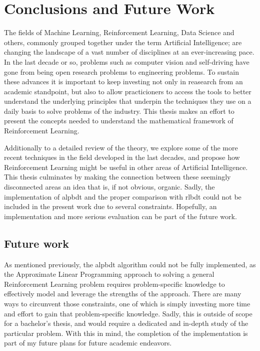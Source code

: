 \chapter{Conclusions and Future Work}
\label{chapter:Conclusions}

The fields of Machine Learning, Reinforcement Learning, Data Science and others,
commonly grouped together under the term Artificial Intelligence; are changing
the landscape of a vast number of disciplines at an ever-increasing pace. In the
last decade or so, problems such as computer vision and self-driving have gone
from being open research problems to engineering problems. To sustain these
advances it is important to keep investing not only in reasearch from an
academic standpoint, but also to allow practicioners to access the tools to
better understand the underlying principles that underpin the techniques they
use on a daily basis to solve problems of the industry. This thesis makes an
effort to present the concepts needed to understand the mathematical framework
of Reinforcement Learning.

Additionally to a detailed review of the theory, we explore some of the more
recent techniques in the field developed in the last decades, and propose how
Reinforcement Learning might be useful in other areas of Artificial
Intelligence. This thesis culminates by making the connection between these
seemingly disconnected areas an idea that is, if not obvious, organic. Sadly,
the implementation of \acf{alpbdt} and the proper comparison with \acf{rlbdt}
could not be included in the present work due to several constraints. Hopefully,
an implementation and more serious evaluation can be part of the future work.

\section{Future work}
As mentioned previously, the \ac{alpbdt} algorithm could not be fully
implemented, as the Approximate Linear Programming approach to solving a general
Reinforcement Learning problem requires problem-specific knowledge to
effectively model and leverage the strengths of the approach. There are many
ways to circunvent those constraints, one of which is simply investing more time
and effort to gain that problem-specific knowledge. Sadly, this is outside of
scope for a bachelor's thesis, and would require a dedicated and in-depth study
of the particular problem. With this in mind, the completion of the
implementation is part of my future plans for future academic endeavors.


